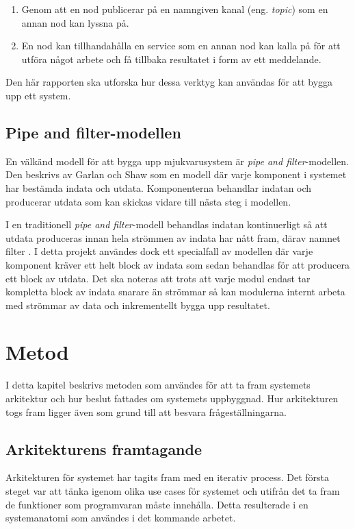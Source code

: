 \begin{enumerate}
	\item Genom att en nod publicerar på en namngiven kanal (eng. \textit{topic}) som en annan nod kan lyssna på.
	
	\item En nod kan tillhandahålla en service som en annan nod kan kalla på för att utföra något arbete och få tillbaka resultatet i form av ett meddelande.
\end{enumerate}

Den här rapporten ska utforska hur dessa verktyg kan användas för att bygga upp ett system.

\subsection{Pipe and filter-modellen}
En välkänd modell för att bygga upp mjukvarusystem är \textit{pipe and filter}-modellen. Den beskrivs av Garlan och Shaw \cite{garlan1993introduction} som en modell där varje komponent i systemet har bestämda indata och utdata. Komponenterna behandlar indatan och producerar utdata som kan skickas vidare till nästa steg i modellen.

I en traditionell \textit{pipe and filter}-modell behandlas indatan kontinuerligt så att utdata produceras innan hela strömmen av indata har nått fram, därav namnet filter \cite{garlan1993introduction}. I detta projekt användes dock ett specialfall av modellen där varje komponent kräver ett helt block av indata som sedan behandlas för att producera ett block av utdata. Det ska noteras att trots att varje modul endast tar kompletta block av indata snarare än strömmar så kan modulerna internt arbeta med strömmar av data och inkrementellt bygga upp resultatet.


\section{Metod}
\label{sec:method-lundberg}
I detta kapitel beskrivs metoden som användes för att ta fram systemets arkitektur och hur beslut fattades om systemets uppbyggnad. Hur arkitekturen togs fram ligger även som grund till att besvara frågeställningarna.

\subsection{Arkitekturens framtagande}
Arkitekturen för systemet har tagits fram med en iterativ process. Det första steget var att tänka igenom olika use cases för systemet och utifrån det ta fram de funktioner som programvaran måste innehålla. Detta resulterade i en systemanatomi som användes i det kommande arbetet.

